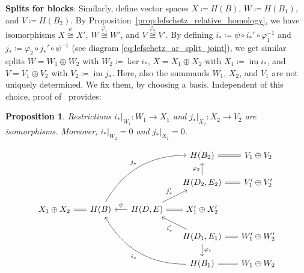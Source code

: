 \documentclass[letterpaper,11pt]{article}
\theoremstyle{plain}
\newtheorem{proposition}[theorem]{Proposition}
\theoremstyle{definition}
\renewcommand{\phi}{\varphi}
\newcommand{\im}{\operatorname{im}}
\newcounter{li}
\newcommand{\imapx}[1]{j_{#1\ast}}
\newcommand\michal[1]{\textcolor{ForestGreen}{[ML: #1]}}
\newcommand{\bl}{B}
\begin{document}
{\bf Splits for blocks}: 
Similarly, define vector spaces
$X\coloneqq H(\bl)$, $W\coloneqq H(\bl_1)$, and $V\coloneqq H(\bl_2)$. 
By Proposition~\ref{prop:lefschetz_relative_homology}, we have
isomorphisms $X\stackrel{\psi}{\cong}X'$, $W\stackrel{\phi_1}{\cong}W'$, and 
$V\stackrel{\phi_2}{\cong}V'$.
By defining 
    $i_\ast\coloneqq\psi\circ i_\ast'\circ \phi_1^{-1}$ and 
    $j_\ast\coloneqq\phi_2\circ j_\ast'\circ \psi^{-1}$ 
    (see diagram \eqref{eq:lefschetz_ar_split_joint}), 
    we get similar splits $W=W_1\oplus W_2$ with 
    $W_2\coloneqq\ker i_\ast$, $X=X_1\oplus X_2$ with $X_1\coloneqq\im i_\ast$,
    and $V=V_1\oplus V_2$ with $V_2\coloneqq\im j_\ast$. 
Here, also the summands $W_1$, $X_2$, and $V_1$ are not uniquely determined. 
We fix them, by choosing a basis. Independent of this choice,
proof of~\cite[Theorem~5.12]{CMbarcodes2025} provides:
\begin{proposition}\label{prop:structure-of-i-j-ast}
    Restrictions $i_\ast|_{W_1}:W_1\rightarrow X_1$ and $j_\ast|_{X_2}:X_2\rightarrow V_2$ are isomorphisms.  
    Moreover, $i_\ast|_{W_2}=0$ and $j_\ast|_{X_1}=0$.
\end{proposition}

\begin{equation}\label{eq:lefschetz_ar_split_joint}
    \begin{tikzcd}[row sep=1.5em, column sep=1.5em]
        & & & H(B_2)\ar[r,equal]& V_1\oplus V_2\\
        & & & H(D_2, E_2)\arrow[u, "\varphi_2"]\ar[r,equal]& V_1'\oplus V_2'\\
        X_1\oplus X_2\ar[r, equal] & H(B) \arrow[rruu, bend left, "j_\ast"]\arrow[r,leftarrow, "\psi"]
            & H(D,E)\arrow[ru, "j_\ast'"] & \ar[l, equal]X_1'\oplus X_2' \\
        & & & H(D_1, E_1)\arrow[d, "\varphi_{1}"]\arrow[lu, "i_\ast'"]\ar[r,equal]& W_1'\oplus W_2'
            \\ %
        & & & H(B_1)\arrow[lluu, bend left, "i_\ast"] \ar[r,equal]& W_1\oplus W_2
    \end{tikzcd}
\end{equation}
\end{document}
